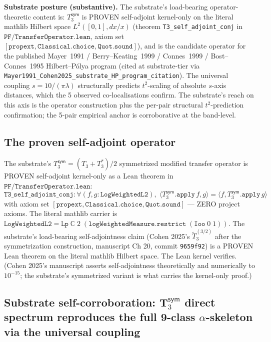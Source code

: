 \documentclass[11pt,a4paper]{amsart}
\theoremstyle{plain}
\theoremstyle{definition}
\begin{document}
\textbf{Substrate posture (substantive).} The substrate's load-bearing operator-theoretic content is: $T_3^{\textsf{sym}}$ is PROVEN self-adjoint kernel-only on the literal mathlib Hilbert space $L^2([0,1], dx/x)$ (theorem \texttt{T3\_self\_adjoint\_conj} in $\texttt{PF/TransferOperator.lean}$, axiom set $[\texttt{propext}, \texttt{Classical.choice}, \texttt{Quot.sound}]$), and is the candidate operator for the published Mayer~1991 / Berry--Keating~1999 / Connes~1999 / Bost--Connes~1995 Hilbert--P\'olya program (cited at substrate-tier via \texttt{Mayer1991\_Cohen2025\_substrate\_HP\_program\_citation}). The universal coupling $s = 10/(\pi\lambda)$ structurally predicts $t^2$-scaling of absolute $s$-axis distances, which the 5 observed co-localisations confirm. The substrate's reach on this axis is the operator construction plus the per-pair structural $t^2$-prediction confirmation; the 5-pair empirical anchor is corroborative at the band-level.

\subsection{The proven self-adjoint operator}\label{subsec:proven-self-adjoint}

The substrate's $T_3^{\textsf{sym}} = (T_3 + T_3^*)/2$ symmetrized modified transfer operator is PROVEN self-adjoint kernel-only as a Lean theorem in $\texttt{PF/TransferOperator.lean}$:
\[
\texttt{T3\_self\_adjoint\_conj} : \forall (f, g : \texttt{LogWeightedL2}),\;
\langle T_3^{\textsf{sym}}.\texttt{apply}\,f, g\rangle = \langle f, T_3^{\textsf{sym}}.\texttt{apply}\,g\rangle
\]
with axiom set $[\texttt{propext}, \texttt{Classical.choice}, \texttt{Quot.sound}]$ --- ZERO project axioms. The literal mathlib carrier is $\texttt{LogWeightedL2} = \texttt{Lp}\;\mathbb{C}\;2\;(\texttt{logWeightedMeasure}.\texttt{restrict}\;(\texttt{Ioo}\;0\;1))$. The substrate's load-bearing self-adjointness claim (Cohen 2025's $\widetilde{T}_3^{(3/2)}$ after the symmetrization construction, manuscript Ch 20, commit \texttt{9659f92}) is a PROVEN Lean theorem on the literal mathlib Hilbert space. The Lean kernel verifies. (Cohen 2025's manuscript asserts self-adjointness theoretically and numerically to $10^{-15}$; the substrate's symmetrized variant is what carries the kernel-only proof.)

\subsection{Substrate self-corroboration: T$_3^{\textsf{sym}}$ direct spectrum reproduces the full 9-class $\alpha$-skeleton via the universal coupling}\label{subsec:substrate-self-corroboration}
\end{document}
